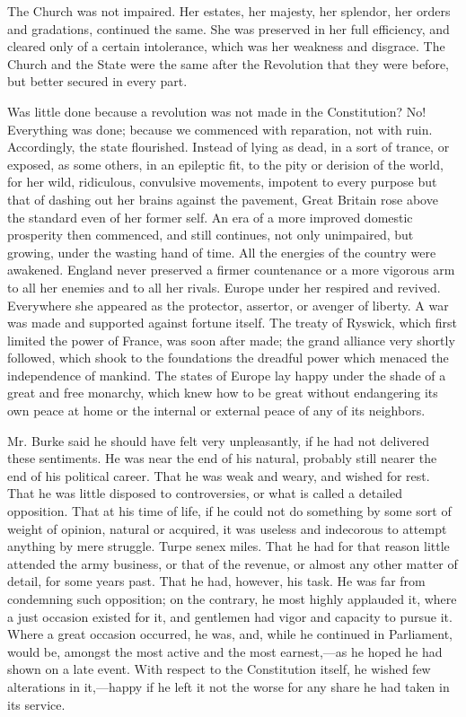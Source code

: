 The Church was not impaired. Her estates, her majesty, her splendor, her orders and gradations, continued the same. She was preserved in her full efficiency, and cleared only of a certain intolerance, which was her weakness and disgrace. The Church and the State were the same after the Revolution that they were before, but better secured in every part.

Was little done because a revolution was not made in the Constitution? No! Everything was done; because we commenced with reparation, not with ruin. Accordingly, the state flourished. Instead of lying as dead, in a sort of trance, or exposed, as some others, in an epileptic fit, to the pity or derision of the world, for her wild, ridiculous, convulsive movements, impotent to every purpose but that of dashing out her brains against the pavement, Great Britain rose above the standard even of her former self. An era of a more improved domestic prosperity then commenced, and still continues, not only unimpaired, but growing, under the wasting hand of time. All the energies of the country were awakened. England never preserved a firmer countenance or a more vigorous arm to all her enemies and to all her rivals. Europe under her respired and revived. Everywhere she appeared as the protector, assertor, or avenger of liberty. A war was made and supported against fortune itself. The treaty of Ryswick, which first limited the power of France, was soon after made; the grand alliance very shortly followed, which shook to the foundations the dreadful power which menaced the independence of mankind. The states of Europe lay happy under the shade of a great and free monarchy, which knew how to be great without endangering its own peace at home or the internal or external peace of any of its neighbors.

Mr. Burke said he should have felt very unpleasantly, if he had not delivered these sentiments. He was near the end of his natural, probably still nearer the end of his political career. That he was weak and weary, and wished for rest. That he was little disposed to controversies, or what is called a detailed opposition. That at his time of life, if he could not do something by some sort of weight of opinion, natural or acquired, it was useless and indecorous to attempt anything by mere struggle. Turpe senex miles. That he had for that reason little attended the army business, or that of the revenue, or almost any other matter of detail, for some years past. That he had, however, his task. He was far from condemning such opposition; on the contrary, he most highly applauded it, where a just occasion existed for it, and gentlemen had vigor and capacity to pursue it. Where a great occasion occurred, he was, and, while he continued in Parliament, would be, amongst the most active and the most earnest,—as he hoped he had shown on a late event. With respect to the Constitution itself, he wished few alterations in it,—happy if he left it not the worse for any share he had taken in its service.

